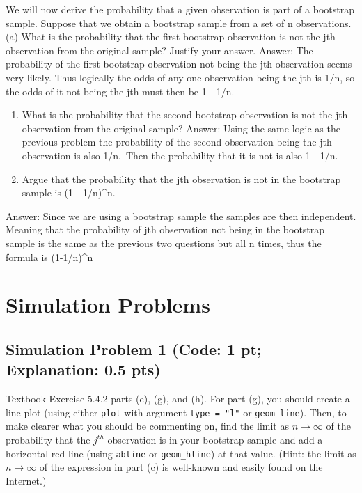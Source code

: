 \documentclass[
]{article}
\begin{document}
We will now derive the probability that a given observation is part of a
bootstrap sample. Suppose that we obtain a bootstrap sample from a set
of n observations. (a) What is the probability that the first bootstrap
observation is not the jth observation from the original sample? Justify
your answer. Answer: The probability of the first bootstrap observation
not being the jth observation seems very likely. Thus logically the odds
of any one observation being the jth is 1/n, so the odds of it not being
the jth must then be 1 - 1/n.

\begin{enumerate}
\def\labelenumi{(\alph{enumi})}
\setcounter{enumi}{1}
\item
  What is the probability that the second bootstrap observation is not
  the jth observation from the original sample? Answer: Using the same
  logic as the previous problem the probability of the second
  observation being the jth observation is also 1/n.~Then the
  probability that it is not is also 1 - 1/n.
\item
  Argue that the probability that the jth observation is not in the
  bootstrap sample is (1 - 1/n)\^{}n.
\end{enumerate}

Answer: Since we are using a bootstrap sample the samples are then
independent. Meaning that the probability of jth observation not being
in the bootstrap sample is the same as the previous two questions but
all n times, thus the formula is (1-1/n)\^{}n

\hypertarget{simulation-problems}{%
\section{Simulation Problems}\label{simulation-problems}}

\hypertarget{simulation-problem-1-code-1-pt-explanation-0.5-pts}{%
\subsection{Simulation Problem 1 (Code: 1 pt; Explanation: 0.5
pts)}\label{simulation-problem-1-code-1-pt-explanation-0.5-pts}}

Textbook Exercise 5.4.2 parts (e), (g), and (h). For part (g), you
should create a line plot (using either \texttt{plot} with argument
\texttt{type\ =\ "l"} or \texttt{geom\_line}). Then, to make clearer
what you should be commenting on, find the limit as
\(n \rightarrow \infty\) of the probability that the \(j^{th}\)
observation is in your bootstrap sample and add a horizontal red line
(using \texttt{abline} or \texttt{geom\_hline}) at that value. (Hint:
the limit as \(n \rightarrow \infty\) of the expression in part (c) is
well-known and easily found on the Internet.)
\end{document}

